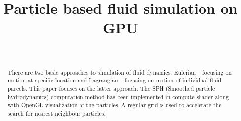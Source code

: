 \documentclass[a4paper,report]{IEEEtran}
\begin{document}
\title{Particle based fluid simulation on GPU}


\author{\\
}
 




\maketitle


\begin{abstract}
	There are two basic approaches to simulation of fluid dynamics: Eulerian -- focusing on motion at specific location and Lagrangian -- focusing on motion of individual fluid parcels. This paper focuses on the latter approach. The SPH (Smoothed particle hydrodynamics) computation method has been implemented in compute shader along with OpenGL visualization of the particles. A regular grid is used to accelerate the search for nearest neighbour particles.

\end{abstract}
\end{document}

